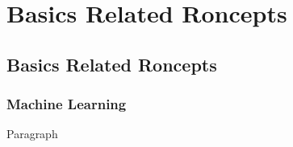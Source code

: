 
\chapter{Basics Related Roncepts} %

\label{c3} %

\section{Basics Related Roncepts}
\subsection{Machine Learning}

\par Paragraph



